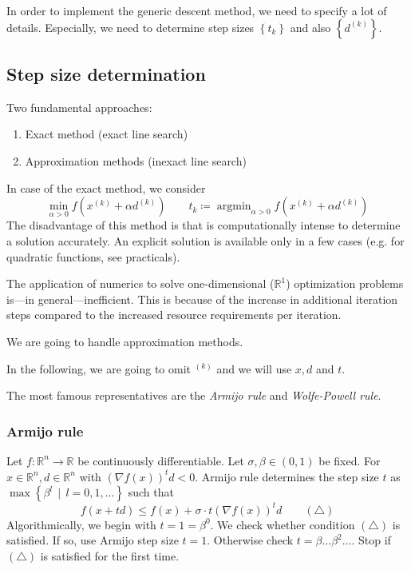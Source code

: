 \documentclass[a4paper]{article}
\numberwithin{lecref}{subsection}
\newcommand{\Set}[1]{\left\{#1\right\}}
\newcommand{\SetDef}[2]{\left\{#1\,\mid\,#2\right\}}
\DeclareMathOperator{\argmin}{argmin}
\begin{document}
In order to implement the generic descent method, we need to specify a lot of details.
Especially, we need to determine step sizes $\Set{t_k}$ and also $\Set{d^{(k)}}$.

\subsection{Step size determination}
\label{section:4}

Two fundamental approaches:
\begin{enumerate}
	\item Exact method (exact line search)
	\item Approximation methods (inexact line search)
\end{enumerate}

In case of the exact method, we consider
\[ \min_{\alpha>0} f(x^{(k)} + \alpha d^{(k)}) \qquad t_k \coloneqq \argmin_{\alpha>0} f(x^{(k)} + \alpha d^{(k)}) \]
The disadvantage of this method is that is computationally intense to determine a solution accurately.
An explicit solution is available only in a few cases (e.g. for quadratic functions, see practicals).

The application of numerics to solve one-dimensional ($\mathbb R^1$) optimization problems is---in general---inefficient. This is because of the increase in additional iteration steps compared to the increased resource requirements per iteration.

We are going to handle approximation methods.

In the following, we are going to omit ${}^{(k)}$ and we will use $x, d$ and $t$.

The most famous representatives are the \emph{Armijo rule} and \emph{Wolfe-Powell rule}.

\subsubsection{Armijo rule}

Let $f: \mathbb R^n \to \mathbb R$ be continuously differentiable.
Let $\sigma, \beta \in (0, 1)$ be fixed.
For $x \in \mathbb R^n, d \in \mathbb R^n$ with $(\nabla f(x))^t d < 0$.
Armijo rule determines the step size $t$ as $\max\SetDef{\beta^l}{l = 0, 1, \dots}$ such that
\[ f(x + td) \leq f(x) + \sigma \cdot t\left(\nabla f(x)\right)^t d \qquad (\triangle) \]
Algorithmically, we begin with $t = 1 = \beta^0$. We check whether condition $(\triangle)$ is satisfied.
If so, use Armijo step size $t = 1$. Otherwise check $t = \beta \dots \beta^2 \dots$. Stop if $(\triangle)$ is satisfied for the first time.
\end{document}

